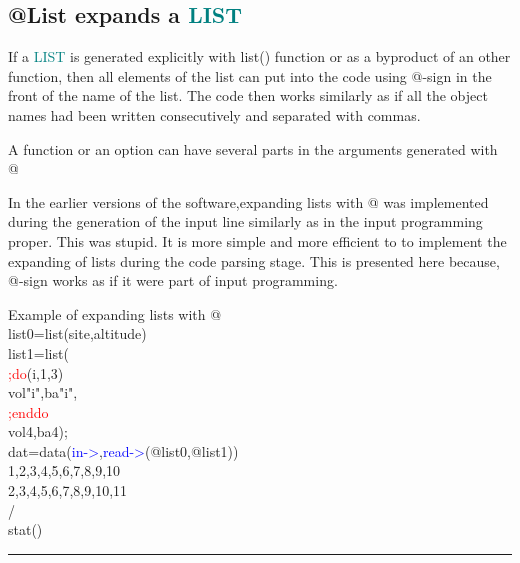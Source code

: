 \subsection{@List expands a \textcolor{teal}{LIST}} 
\label{expand} 
If a \textcolor{teal}{LIST} is generated explicitly with \textcolor{VioletRed}{list}() function or as a byproduct of an other function, 
then all elements of the list can put into the code using @-sign in the front of the name of the list. 
The code then works similarly as if all the object names had been written consecutively and separated 
with commas. 
\begin{note} 
A function or an option can have several parts in the arguments generated with @ 
\end{note} 
\begin{note} 
In the earlier versions of the software,expanding lists with @ was implemented during the generation of 
the input line similarly as in the input programming proper. This was stupid. It is more simple and more efficient to 
to implement the expanding of lists during the code parsing stage. This is presented here because, @-sign works 
as if it were part of input programming. 
\end{note} 
\singlespacing 
\begin{example}[expandex]Example of expanding lists with @\\ 
\label{expandex} 
\noindent list0=\textcolor{VioletRed}{list}(site,altitude)\\ 
list1=\textcolor{VioletRed}{list}(\\ 
\textcolor{Red}{;do}(i,1,3)\\ 
vol"i",ba"i",\\ 
\textcolor{Red}{;enddo}\\ 
vol4,ba4);\\ 
dat=\textcolor{VioletRed}{data}(\textcolor{blue}{in->},\textcolor{blue}{read->}(@list0,@list1))\\ 
1,2,3,4,5,6,7,8,9,10\\ 
2,3,4,5,6,7,8,9,10,11\\ 
/                    \\ 
\textcolor{VioletRed}{stat}()\\ 
\end{example} 
\vspace{-7mm} \rule{5cm}{0.1pt} 
\onehalfspacing 
 
